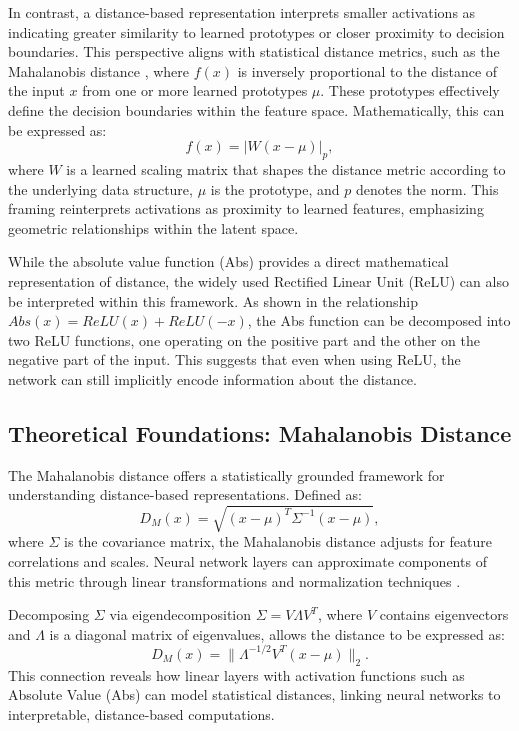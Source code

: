 In contrast, a distance-based representation interprets smaller activations as indicating greater similarity to learned prototypes or closer proximity to decision boundaries. This perspective aligns with statistical distance metrics, such as the Mahalanobis distance \cite{mahalanobis1936generalized}, where $f(x)$ is inversely proportional to the distance of the input $x$ from one or more learned prototypes $\mu$. These prototypes effectively define the decision boundaries within the feature space. Mathematically, this can be expressed as:
\begin{equation}
f(x) = |W(x - \mu)|_p,
\end{equation}
where $W$ is a learned scaling matrix that shapes the distance metric according to the underlying data structure, $\mu$ is the prototype, and $p$ denotes the norm. This framing reinterprets activations as proximity to learned features, emphasizing geometric relationships within the latent space.

While the absolute value function (Abs) provides a direct mathematical representation of distance, the widely used Rectified Linear Unit (ReLU) can also be interpreted within this framework. As shown in the relationship $Abs(x) = ReLU(x) + ReLU(-x)$, the Abs function can be decomposed into two ReLU functions, one operating on the positive part and the other on the negative part of the input. This suggests that even when using ReLU, the network can still implicitly encode information about the distance.

\subsection{Theoretical Foundations: Mahalanobis Distance}

The Mahalanobis distance offers a statistically grounded framework for understanding distance-based representations. Defined as:
\begin{equation}
    D_M(x) = \sqrt{(x - \mu)^T \Sigma^{-1} (x - \mu)},
\end{equation}
where $\Sigma$ is the covariance matrix, the Mahalanobis distance adjusts for feature correlations and scales. Neural network layers can approximate components of this metric through linear transformations and normalization techniques \cite{oursland2024interpreting}.

Decomposing $\Sigma$ via eigendecomposition $\Sigma = V\Lambda V^T$, where $V$ contains eigenvectors and $\Lambda$ is a diagonal matrix of eigenvalues, allows the distance to be expressed as:
\begin{equation}
    D_M(x) = \| \Lambda^{-1/2} V^T (x - \mu) \|_2.
\end{equation}
This connection reveals how linear layers with activation functions such as Absolute Value (Abs) can model statistical distances, linking neural networks to interpretable, distance-based computations.

